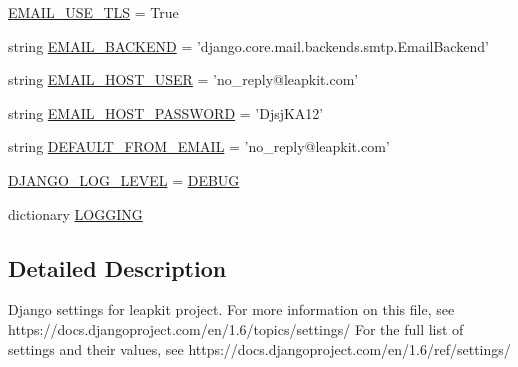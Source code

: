 \begin{DoxyCompactItemize}
\item 
\hyperlink{namespaceleapkit_1_1settings_1_1base__settings_a79583490f9302cd174db838976e6c7d8}{E\-M\-A\-I\-L\-\_\-\-U\-S\-E\-\_\-\-T\-L\-S} = True
\item 
string \hyperlink{namespaceleapkit_1_1settings_1_1base__settings_acfd75926f606a39a2579e1523f3e9e47}{E\-M\-A\-I\-L\-\_\-\-B\-A\-C\-K\-E\-N\-D} = 'django.\-core.\-mail.\-backends.\-smtp.\-Email\-Backend'
\item 
string \hyperlink{namespaceleapkit_1_1settings_1_1base__settings_a0d5c80fb6dd72ac62917be058ffcc68a}{E\-M\-A\-I\-L\-\_\-\-H\-O\-S\-T\-\_\-\-U\-S\-E\-R} = 'no\-\_\-reply@leapkit.\-com'
\item 
string \hyperlink{namespaceleapkit_1_1settings_1_1base__settings_ab5fcb026aa0d21e4b8c1193193ad3498}{E\-M\-A\-I\-L\-\_\-\-H\-O\-S\-T\-\_\-\-P\-A\-S\-S\-W\-O\-R\-D} = 'Djsj\-K\-A12'
\item 
string \hyperlink{namespaceleapkit_1_1settings_1_1base__settings_af206780fdb9ab158e32739bc91b3c804}{D\-E\-F\-A\-U\-L\-T\-\_\-\-F\-R\-O\-M\-\_\-\-E\-M\-A\-I\-L} = 'no\-\_\-reply@leapkit.\-com'
\item 
\hyperlink{namespaceleapkit_1_1settings_1_1base__settings_aa84dc9d6a4399648a2a241c7fefd1584}{D\-J\-A\-N\-G\-O\-\_\-\-L\-O\-G\-\_\-\-L\-E\-V\-E\-L} = \hyperlink{namespaceleapkit_1_1settings_1_1base__settings_a45b59b8d0ca3a36509b2ccbba0d7d452}{D\-E\-B\-U\-G}
\item 
dictionary \hyperlink{namespaceleapkit_1_1settings_1_1base__settings_a328250584cfc798b4f3129acc09e81e2}{L\-O\-G\-G\-I\-N\-G}
\end{DoxyCompactItemize}


\subsection{Detailed Description}
\begin{DoxyVerb}Django settings for leapkit project.
For more information on this file, see
https://docs.djangoproject.com/en/1.6/topics/settings/
For the full list of settings and their values, see
https://docs.djangoproject.com/en/1.6/ref/settings/
\end{DoxyVerb}
 


